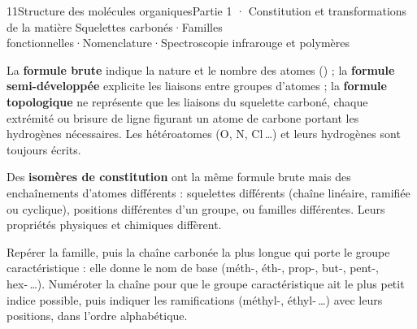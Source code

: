 \begin{ouverture}[molecules]{11}{Structure des molécules organiques}{Partie 1 · Constitution et transformations de la matière}
{Squelettes carbonés\enspace·\enspace Familles fonctionnelles\enspace·\enspace Nomenclature\enspace·\enspace Spectroscopie infrarouge et polymères}
\end{ouverture}
\essentiel
{}
\begin{definition}
La \textbf{formule brute} indique la nature et le nombre des atomes () ; la \textbf{formule semi-développée}
explicite les liaisons entre groupes d'atomes ; la \textbf{formule topologique} ne représente que les liaisons du
squelette carboné, chaque extrémité ou brisure de ligne figurant un atome de carbone portant les hydrogènes
nécessaires. Les hétéroatomes (O, N, Cl\,\dots) et leurs hydrogènes sont toujours écrits.
\end{definition}
\begin{definition}
Des \textbf{isomères de constitution} ont la même formule brute mais des enchaînements d'atomes différents : squelettes
différents (chaîne linéaire, ramifiée ou cyclique), positions différentes d'un groupe, ou familles différentes. Leurs
propriétés physiques et chimiques diffèrent.
\end{definition}
\begin{savoirfaire}
Repérer la famille, puis la chaîne carbonée la plus longue qui porte le groupe caractéristique : elle donne le nom de
base (méth-, éth-, prop-, but-, pent-, hex-\,\dots). Numéroter la chaîne pour que le groupe caractéristique ait le plus
petit indice possible, puis indiquer les ramifications (méthyl-, éthyl-\,\dots) avec leurs positions, dans l'ordre
alphabétique.
\end{savoirfaire}
